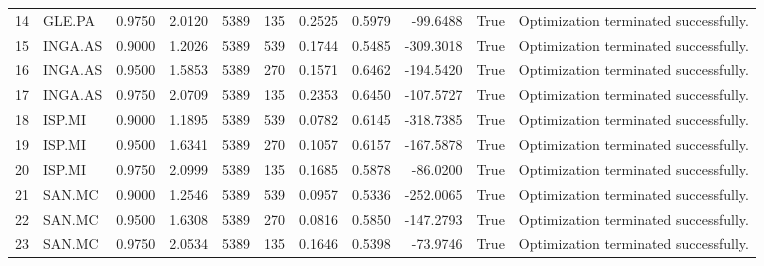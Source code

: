 \begin{table}
\begin{tabular}{llrrrrrrrrl}
14 & GLE.PA & 0.9750 & 2.0120 & 5389 & 135 & 0.2525 & 0.5979 & -99.6488 & True & Optimization terminated successfully. \\
15 & INGA.AS & 0.9000 & 1.2026 & 5389 & 539 & 0.1744 & 0.5485 & -309.3018 & True & Optimization terminated successfully. \\
16 & INGA.AS & 0.9500 & 1.5853 & 5389 & 270 & 0.1571 & 0.6462 & -194.5420 & True & Optimization terminated successfully. \\
17 & INGA.AS & 0.9750 & 2.0709 & 5389 & 135 & 0.2353 & 0.6450 & -107.5727 & True & Optimization terminated successfully. \\
18 & ISP.MI & 0.9000 & 1.1895 & 5389 & 539 & 0.0782 & 0.6145 & -318.7385 & True & Optimization terminated successfully. \\
19 & ISP.MI & 0.9500 & 1.6341 & 5389 & 270 & 0.1057 & 0.6157 & -167.5878 & True & Optimization terminated successfully. \\
20 & ISP.MI & 0.9750 & 2.0999 & 5389 & 135 & 0.1685 & 0.5878 & -86.0200 & True & Optimization terminated successfully. \\
21 & SAN.MC & 0.9000 & 1.2546 & 5389 & 539 & 0.0957 & 0.5336 & -252.0065 & True & Optimization terminated successfully. \\
22 & SAN.MC & 0.9500 & 1.6308 & 5389 & 270 & 0.0816 & 0.5850 & -147.2793 & True & Optimization terminated successfully. \\
23 & SAN.MC & 0.9750 & 2.0534 & 5389 & 135 & 0.1646 & 0.5398 & -73.9746 & True & Optimization terminated successfully. \\
\bottomrule
\end{tabular}
\end{table}
